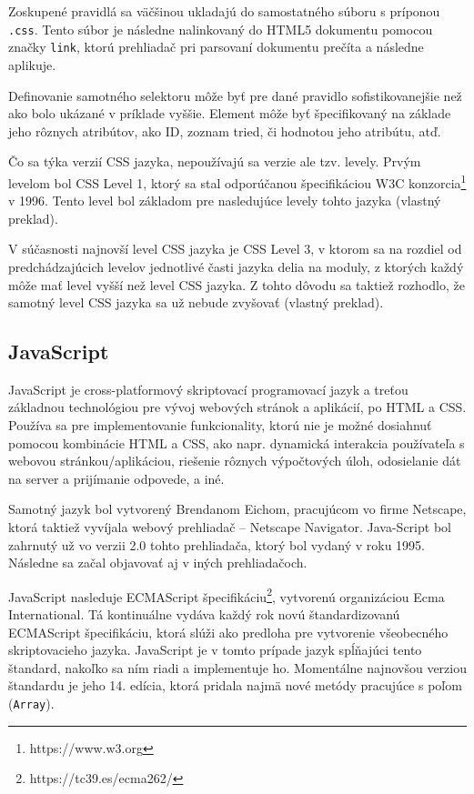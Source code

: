 Zoskupené pravidlá sa väčšinou ukladajú do samostatného súboru s príponou \texttt{.css}. Tento súbor je následne nalinkovaný do HTML5 dokumentu pomocou značky \texttt{link}, ktorú prehliadač pri parsovaní dokumentu prečíta a následne aplikuje.

Definovanie samotného selektoru môže byť pre dané pravidlo sofistikovanejšie než ako bolo ukázané v príklade vyššie. Element môže byť špecifikovaný na základe jeho rôznych atribútov, ako ID, zoznam tried, či hodnotou jeho atribútu, atď.

Čo sa týka verzií CSS jazyka, nepoužívajú sa verzie ale tzv. levely. Prvým levelom bol CSS Level 1, ktorý sa stal odporúčanou špecifikáciou W3C konzorcia\footnote{https://www.w3.org} v 1996. Tento level bol základom pre nasledujúce levely tohto jazyka \cite{about_css} (vlastný preklad).

V súčasnosti najnovší level CSS jazyka je CSS Level 3, v ktorom sa na rozdiel od predchádzajúcich levelov jednotlivé časti jazyka delia na moduly, z ktorých každý môže mať level vyšší než level CSS jazyka. Z tohto dôvodu sa taktiež rozhodlo, že samotný level CSS jazyka sa už nebude zvyšovať \cite{about_css} (vlastný preklad).

\subsection {JavaScript}
JavaScript je cross-platformový skriptovací programovací jazyk a treťou základnou technológiou pre vývoj webových stránok a aplikácií, po HTML a CSS. Používa sa pre implementovanie funkcionality, ktorú nie je možné dosiahnuť pomocou kombinácie HTML a CSS, ako napr. dynamická interakcia používateľa s webovou stránkou/aplikáciou, riešenie rôznych výpočtových úloh, odosielanie dát na server a prijímanie odpovede, a iné.

Samotný jazyk bol vytvorený Brendanom Eichom, pracujúcom vo firme Netscape, ktorá taktiež vyvíjala webový prehliadač -- Netscape Navigator. Java-\newline Script bol zahrnutý už vo verzii 2.0 tohto prehliadača, ktorý bol vydaný v roku 1995. Následne sa začal objavovať aj v iných prehliadačoch. 

JavaScript nasleduje ECMAScript špecifikáciu\footnote{https://tc39.es/ecma262/}, vytvorenú organizáciou Ecma International. Tá kontinuálne vydáva každý rok novú štandardizovanú ECMAScript špecifikáciu, ktorá slúži ako predloha pre vytvorenie všeobecného skriptovacieho jazyka. JavaScript je v tomto prípade jazyk spĺňajúci tento štandard, nakoľko sa ním riadi a implementuje ho. Momentálne najnovšou verziou štandardu je jeho 14. edícia, ktorá pridala najmä nové metódy pracujúce s poľom (\texttt{Array}).


